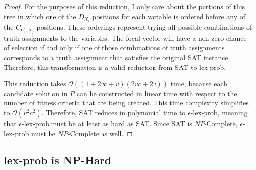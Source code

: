 \documentclass[sigconf]{acmart}
\begin{document}
\begin{proof}
For the purposes of this reduction, I only care about the portions of this tree in which one of the $D_{X_{i}}$ positions for each variable is ordered before any of the $C_{C_{i},X_{j}}$ positions. These orderings represent trying all possible combinations of truth assignments to the variables. The focal vector will have a non-zero chance of selection if and only if one of those combinations of truth assignments corresponds to a truth assignment that satisfies the original {\sc SAT} instance. Therefore, this transformation is a valid reduction from {\sc SAT} to {\sc lex-prob}.

This reduction takes $\mathcal{O}((1 + 2vc + v)(2vc + 2v))$ time, because each candidate solution in $P$ can be constructed in linear time with respect to the number of fitness criteria that are being created. This time complexity simplifies to $\mathcal{O}(v^2c^2)$. Therefore, {\sc SAT} reduces in polynomial time to {\sc $\epsilon$-lex-prob}, meaning that {\sc $\epsilon$-lex-prob} must be at least as hard as {\sc SAT}. Since {\sc SAT} is $NP$-Complete, {\sc $\epsilon$-lex-prob} must be $NP$-Complete as well.

\end{proof}

\subsection{{\sc lex-prob} is NP-Hard}
\end{document}
